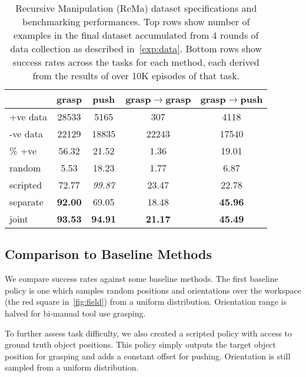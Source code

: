 \documentclass[10pt,twocolumn,letterpaper]{article}
\begin{document}
\begin{table}
  \centering
  \begin{tabular}{l c c c c}
    \toprule
    & grasp & push & grasp$\rightarrow$grasp & grasp$\rightarrow$push \\
    \midrule
    +ve data & 28533 & 5165 & 307 & 4118 \\
    -ve data & 22129 & 18835 & 22243 & 17540 \\
    \% +ve & 56.32 & 21.52 & 1.36 & 19.01\\
    \midrule
    random   & 5.53          & 18.23       & 1.77        & 6.87      \\
scripted & 72.77         & \emph{99.87}      & 23.47        & 22.78     \\
separate & \textbf{92.00}         & 69.05      & 18.48        & \textbf{45.96}     \\  
joint    & \textbf{93.53}         & \textbf{94.91}      & \textbf{21.17}        & \textbf{45.49}   \\
    \bottomrule
  \end{tabular}
  \caption{Recursive Manipulation (ReMa) dataset specifications and benchmarking performances. Top rows show number of examples in the final dataset accumulated from 4 rounds of data collection as described in~\cref{exp:data}. Bottom rows show success rates across the tasks for each method, each derived from the results of over 10K episodes of that task.}
  \label{tab:sr}
\end{table}




\subsection{Comparison to Baseline Methods}
\label{sec:baselines}

We compare success rates against some baseline methods. The first baseline policy is one which samples random positions and orientations over the workspace (the red square in~\cref{fig:field}) from a uniform distribution. Orientation range is halved for bi-manual tool use grasping.

To further assess task difficulty, we also created a scripted policy with access to ground truth object positions. This policy simply outputs the target object position for grasping and adds a constant offset for pushing. Orientation is still sampled from a uniform distribution.
\end{document}
